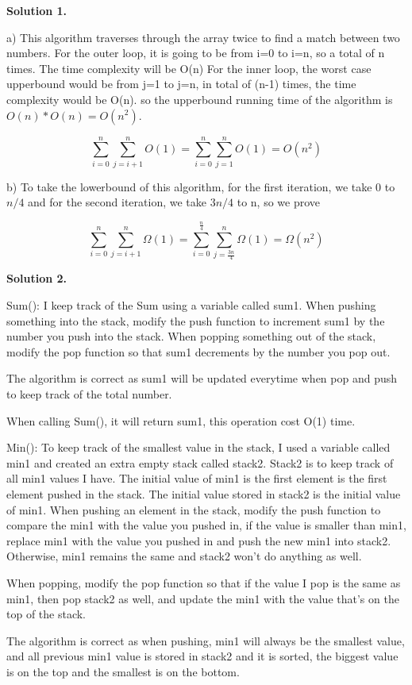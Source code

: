 \documentclass[12pt]{article}
\newcommand{\solution}[1]{\noindent \textbf{Solution #1.}}
\begin{document}
\solution{1} 

a) This algorithm traverses through the array twice to find a match between two numbers.
For the outer loop, it is going to be from i=0 to i=n, so a total of n times. The time complexity will be O(n)
For the inner loop, the worst case upperbound would be from j=1 to j=n, in total of (n-1) times, the time complexity would be O(n).
so the upperbound running time of the algorithm is $O(n)*O(n)=O(n^2)$. 

\[\sum_{i=0}^n\sum_{j=i+1}^nO\left(1\right)=\sum_{i=0}^n\sum_{j=1}^nO\left(1\right)=O\left(n^2\right)\]

b) To take the lowerbound of this algorithm, for the first iteration, we take 0 to $n/4$ and for the second iteration, 
we take $3n/4$ to n, so we prove

\[\sum_{i=0}^n\sum_{j=i+1}^n\Omega\left(1\right)=\sum_{i=0}^{\frac{n}{4}}\sum_{j=\frac{3n}{4}}^n\Omega\left(1\right)=\Omega\left(n^2\right)\]

\solution{2} 

Sum(): I keep track of the Sum using a variable called sum1. When pushing something into the stack, modify the push function to increment sum1 by the number
you push into the stack. When popping something out of the stack, modify the pop function so that sum1 decrements by the number you pop out. 

The algorithm is correct as sum1 will be updated everytime when pop and push to keep track of the total number.

When calling Sum(), it will
return sum1, this operation cost O(1) time.

Min(): To keep track of the smallest value in the stack, I used a variable called min1 and created an extra empty stack called stack2. 
Stack2 is to keep track of all min1 values I have.
The initial value of min1 is the first element is the first element pushed in the stack. The initial value stored in stack2 is the initial value of min1.
When pushing an element in the stack,
modify the push function to compare the min1 with the value you pushed in,
if the value is smaller than min1, replace min1 with the value you pushed in and push the new min1 into stack2. Otherwise, min1 remains the same and stack2 won't do anything as well.


When popping, modify the pop function so that if the value I pop is the same as min1, then pop stack2 as well, and update the min1 with the 
value that's on the top of the stack.

The algorithm is correct as when pushing, min1 will always be the smallest value, and all previous min1 value is stored in stack2 and it is sorted, the biggest value is on the top and the smallest is on the bottom.
\end{document}
